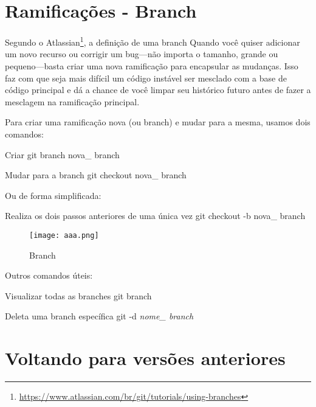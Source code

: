 \documentclass[aspectratio=169]{beamer}
\begin{document}
\section{Ramificações - Branch}
\begin{frame}{\insertsectionhead}
	\begin{block}{Segundo o Atlassian\footnote{\url{https://www.atlassian.com/br/git/tutorials/using-branches}}, a definição de uma branch}
		Quando você quiser adicionar um novo recurso ou corrigir um bug—não importa o tamanho, grande ou pequeno—basta criar uma nova ramificação para encapsular as mudanças. Isso faz com que seja mais difícil um código instável ser mesclado com a base de código principal e dá a chance de você limpar seu histórico futuro antes de fazer a mesclagem na ramificação principal.
	\end{block}
\end{frame}
\begin{frame}
	Para criar uma ramificação nova (ou branch) e mudar para a mesma, usamos dois comandos:
	\begin{block}{Criar}
		git branch nova\_ branch
	\end{block}
	\begin{block}{Mudar para a branch}
		git checkout nova\_ branch
	\end{block}
	Ou de forma simplificada:
	\begin{block}{Realiza os dois passos anteriores de uma única vez}
		git checkout -b nova\_ branch
	\end{block}
\end{frame}
\begin{frame}
	\begin{figure}
		\centering
		\texttt{[image: aaa.png]}
		\caption{Branch}
	\end{figure}
\end{frame}
\begin{frame}
	Outros comandos úteis:
	\begin{block}{Visualizar todas as branches}
		git branch
	\end{block}
	\begin{block}{Deleta uma branch específica}
		git -d \textit{nome\_ branch}
	\end{block}
\end{frame}

\section{Voltando para versões anteriores}
\begin{frame}{\insertsectionhead}

\end{frame}
\end{document}
